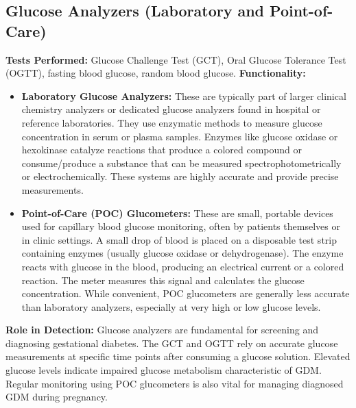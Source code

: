 \documentclass{article}
\begin{document}
\subsection{Glucose Analyzers (Laboratory and Point-of-Care)}
\textbf{Tests Performed:} Glucose Challenge Test (GCT), Oral Glucose Tolerance Test (OGTT), fasting blood glucose, random blood glucose.
\textbf{Functionality:}
\begin{itemize}
    \item \textbf{Laboratory Glucose Analyzers:} These are typically part of larger clinical chemistry analyzers or dedicated glucose analyzers found in hospital or reference laboratories. They use enzymatic methods to measure glucose concentration in serum or plasma samples. Enzymes like glucose oxidase or hexokinase catalyze reactions that produce a colored compound or consume/produce a substance that can be measured spectrophotometrically or electrochemically. These systems are highly accurate and provide precise measurements.
    \item \textbf{Point-of-Care (POC) Glucometers:} These are small, portable devices used for capillary blood glucose monitoring, often by patients themselves or in clinic settings. A small drop of blood is placed on a disposable test strip containing enzymes (usually glucose oxidase or dehydrogenase). The enzyme reacts with glucose in the blood, producing an electrical current or a colored reaction. The meter measures this signal and calculates the glucose concentration. While convenient, POC glucometers are generally less accurate than laboratory analyzers, especially at very high or low glucose levels.
\end{itemize}
\textbf{Role in Detection:} Glucose analyzers are fundamental for screening and diagnosing gestational diabetes. The GCT and OGTT rely on accurate glucose measurements at specific time points after consuming a glucose solution. Elevated glucose levels indicate impaired glucose metabolism characteristic of GDM. Regular monitoring using POC glucometers is also vital for managing diagnosed GDM during pregnancy.
\end{document}

